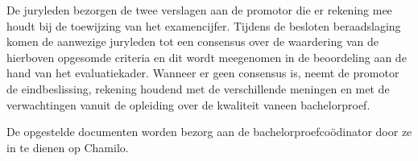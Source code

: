 De juryleden bezorgen de twee verslagen aan de promotor die er rekening mee houdt bij de toewijzing van het examencijfer. Tijdens de besloten beraadslaging komen de aanwezige juryleden tot een consensus over de waardering van de hierboven opgesomde criteria en dit wordt meegenomen in de beoordeling aan de hand van het evaluatiekader. Wanneer er geen consensus is, neemt de promotor de eindbeslissing, rekening houdend met de verschillende meningen en met de verwachtingen vanuit de opleiding over de kwaliteit vaneen bachelorproef.

De opgestelde documenten worden bezorg aan de bachelorproefcoödinator door ze in te dienen op Chamilo.


